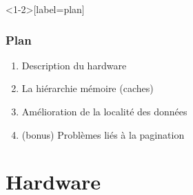 \documentclass[xcolor={x11names,svgnames}, 14pt]{beamer}
\begin{document}

\begin{frame}<1-2>[label=plan]
  \frametitle{Plan}

  \begin{enumerate}
  \item<alert@2> Description du hardware

    \bigskip
    
  \item La hiérarchie mémoire (caches)

    \bigskip

  \item Amélioration de la localité des données

        \bigskip

  \item (bonus) Problèmes liés à la pagination
  \end{enumerate}
  
\end{frame}



\section{Hardware}
\end{document}
